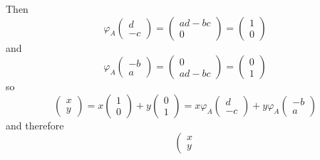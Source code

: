 \documentclass{article}
\begin{document}
\begin{Answer}
\begin{enumerate}[(a)]
{\begin{itemize}
{        Then
        $$
        \varphi_A
          \left(\begin{array}{r}
            d \\ -c
          \end{array}\right) =
          \left(\begin{array}{c}
            ad - bc \\ 0
          \end{array}\right) =
          \left(\begin{array}{c}
            1 \\ 0
          \end{array}\right)
        $$
        and
        $$
        \varphi_A
          \left(\begin{array}{r}
            -b \\ a
          \end{array}\right) =
          \left(\begin{array}{c}
            0 \\ ad - bc
          \end{array}\right) =
          \left(\begin{array}{c}
            0 \\ 1
          \end{array}\right)
        $$
        so
        $$
        \left(\begin{array}{c}
          x \\ y
        \end{array}\right) =
          x
          \left(\begin{array}{c}
            1 \\ 0
          \end{array}\right) +
          y
          \left(\begin{array}{c}
            0 \\ 1
          \end{array}\right) =
          x \varphi_A
          \left(\begin{array}{r}
            d \\ -c
          \end{array}\right) +
          y \varphi_A
          \left(\begin{array}{r}
            -b \\ a
          \end{array}\right)
        $$
        and therefore
        $$
        \left(\begin{array}{c}
          x \\ y

\end{array}$$}
\end{itemize}}
\end{enumerate}
\end{Answer}
\end{document}
